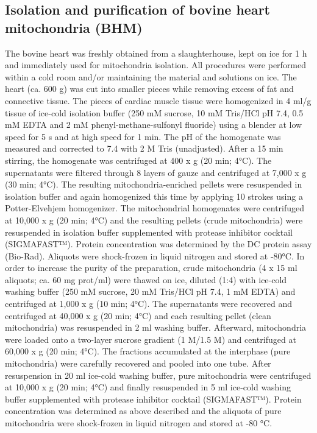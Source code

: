 \subsection*{Isolation and purification of bovine heart mitochondria (BHM)}
The bovine heart was freshly obtained from a slaughterhouse, kept on ice for 1 h and immediately used for mitochondria isolation. All procedures were performed within a cold room and/or maintaining the material and solutions on ice. The heart (ca. 600 g) was cut into smaller pieces while removing excess of fat and connective tissue. The pieces of cardiac muscle tissue were homogenized in 4 ml/g tissue of ice-cold isolation buffer (250 mM sucrose, 10 mM Tris/HCl pH 7.4, 0.5 mM EDTA and 2 mM phenyl-methane-sulfonyl fluoride) using a blender at low speed for 5 s and at high speed for 1 min. The pH of the homogenate was measured and corrected to 7.4 with 2 M Tris (unadjusted). After a 15 min stirring, the homogenate was centrifuged at 400 x g (20 min; 4°C). The supernatants were filtered through 8 layers of gauze and centrifuged at 7,000 x g (30 min; 4°C). The resulting mitochondria-enriched pellets were resuspended in isolation buffer and again homogenized this time by applying 10 strokes using a Potter-Elvehjem homogenizer. The mitochondrial homogenates were centrifuged at 10,000 x g (20 min; 4°C) and the resulting pellets (crude mitochondria) were resuspended in isolation buffer supplemented with protease inhibitor cocktail (SIGMAFAST™). Protein concentration was determined by the DC protein assay (Bio-Rad). Aliquots were shock-frozen in liquid nitrogen and stored at -80°C. In order to increase the purity of the preparation, crude mitochondria (4 x 15 ml aliquots; ca. 60 mg prot/ml) were thawed on ice, diluted (1:4) with ice-cold washing buffer (250 mM sucrose, 20 mM Tris/HCl pH 7.4, 1 mM EDTA) and centrifuged at 1,000 x g (10 min; 4°C). The supernatants were recovered and centrifuged at 40,000 x g (20 min; 4°C) and each resulting pellet (clean mitochondria) was resuspended in 2 ml washing buffer. Afterward, mitochondria were loaded onto a two-layer sucrose gradient (1 M/1.5 M) and centrifuged at 60,000 x g (20 min; 4°C). The fractions accumulated at the interphase (pure mitochondria) were carefully recovered and pooled into one tube. After resuspension in 20 ml ice-cold washing buffer, pure mitochondria were centrifuged at 10,000 x g (20 min; 4°C) and finally resuspended in 5 ml ice-cold washing buffer supplemented with protease inhibitor cocktail (SIGMAFAST™). Protein concentration was determined as above described and the aliquots of pure mitochondria were shock-frozen in liquid nitrogen and stored at -80 °C.

